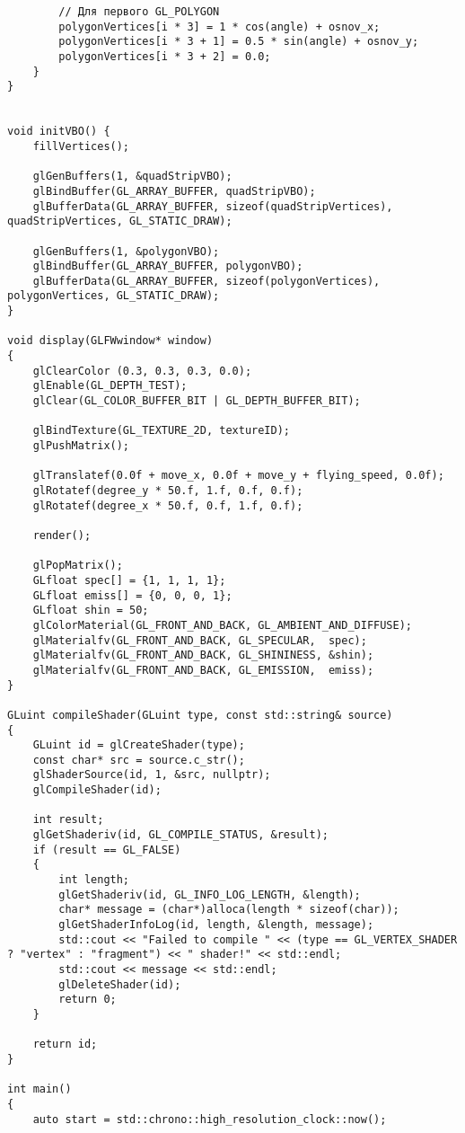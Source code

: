 \documentclass[a4paper, 14pt]{extarticle}
\begin{document}
\begin{verbatim}
        // Для первого GL_POLYGON
        polygonVertices[i * 3] = 1 * cos(angle) + osnov_x;
        polygonVertices[i * 3 + 1] = 0.5 * sin(angle) + osnov_y;
        polygonVertices[i * 3 + 2] = 0.0;
    }
}


void initVBO() {
    fillVertices();

    glGenBuffers(1, &quadStripVBO);
    glBindBuffer(GL_ARRAY_BUFFER, quadStripVBO);
    glBufferData(GL_ARRAY_BUFFER, sizeof(quadStripVertices), quadStripVertices, GL_STATIC_DRAW);

    glGenBuffers(1, &polygonVBO);
    glBindBuffer(GL_ARRAY_BUFFER, polygonVBO);
    glBufferData(GL_ARRAY_BUFFER, sizeof(polygonVertices), polygonVertices, GL_STATIC_DRAW);
}

void display(GLFWwindow* window)
{
    glClearColor (0.3, 0.3, 0.3, 0.0);
    glEnable(GL_DEPTH_TEST);
    glClear(GL_COLOR_BUFFER_BIT | GL_DEPTH_BUFFER_BIT);

    glBindTexture(GL_TEXTURE_2D, textureID);
    glPushMatrix();

    glTranslatef(0.0f + move_x, 0.0f + move_y + flying_speed, 0.0f);
    glRotatef(degree_y * 50.f, 1.f, 0.f, 0.f);
    glRotatef(degree_x * 50.f, 0.f, 1.f, 0.f);

    render();

    glPopMatrix();
    GLfloat spec[] = {1, 1, 1, 1};
    GLfloat emiss[] = {0, 0, 0, 1};
    GLfloat shin = 50;
    glColorMaterial(GL_FRONT_AND_BACK, GL_AMBIENT_AND_DIFFUSE);
    glMaterialfv(GL_FRONT_AND_BACK, GL_SPECULAR,  spec);
    glMaterialfv(GL_FRONT_AND_BACK, GL_SHININESS, &shin);
    glMaterialfv(GL_FRONT_AND_BACK, GL_EMISSION,  emiss);
}

GLuint compileShader(GLuint type, const std::string& source)
{
    GLuint id = glCreateShader(type);
    const char* src = source.c_str();
    glShaderSource(id, 1, &src, nullptr);
    glCompileShader(id);

    int result;
    glGetShaderiv(id, GL_COMPILE_STATUS, &result);
    if (result == GL_FALSE)
    {
        int length;
        glGetShaderiv(id, GL_INFO_LOG_LENGTH, &length);
        char* message = (char*)alloca(length * sizeof(char));
        glGetShaderInfoLog(id, length, &length, message);
        std::cout << "Failed to compile " << (type == GL_VERTEX_SHADER ? "vertex" : "fragment") << " shader!" << std::endl;
        std::cout << message << std::endl;
        glDeleteShader(id);
        return 0;
    }

    return id;
}

int main()
{
    auto start = std::chrono::high_resolution_clock::now();


\end{verbatim}
\end{document}
